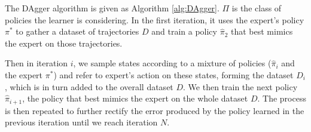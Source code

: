 \documentclass[twoside,11pt]{article}
\begin{document}
The DAgger algorithm is given as Algorithm \ref{alg:DAgger}.
$\Pi$ is the class of policies the learner is considering.
In the first iteration, it uses the expert's policy $\pi^*$ to gather
a dataset of trajectories $D$ and train a policy $\hat{\pi}_2$ that best mimics the expert on those trajectories. 

Then in iteration $i$, we sample states according to a mixture of policies ($\hat{\pi}_i$ and the expert $\pi^*$) and refer to expert's action on these states, forming the dataset $D_i$, which is in turn added to the overall dataset $D$. We then train the next policy $\hat{\pi}_{i+1}$, the policy that best mimics the expert on the whole dataset $D$. The process is then repeated to further rectify the error produced by the policy learned in the previous iteration until we reach iteration $N$.









\end{document}
